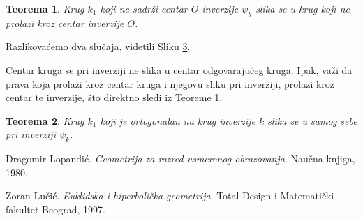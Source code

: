 \documentclass[a4paper,12pt]{article}
\newtheorem{teorema}{{Teorema}}[section]
\theoremstyle{definition}
\newcommand{\RomanNumeralCaps}[1]
    {\MakeUppercase{\romannumeral #1}}
\begin{document}
\begin{teorema}
\label{th:krugkrug}
Krug $k_1$ koji ne sadr\v{z}i centar $O$ inverzije $\psi_k$ slika se u krug koji ne prolazi kroz centar inverzije $O$.
\end{teorema}
Razlikova\'{c}emo dva slu\v{c}aja, videtili Sliku \ref{slk:2}.

\begin{figure}[h!]
	\begin{subfigure}{85mm}
		
		\label{slk:seku}
	\end{subfigure}
	\begin{subfigure}{85mm}
		
		\label{slk:ne_seku}
	\end{subfigure}
\caption{}
\label{sl:krugprava}
\label{slk:2}
\end{figure}

Centar kruga se pri inverziji ne slika u centar odgovaraju\'{c}eg kruga. Ipak, va\v{z}i da prava koja prolazi kroz centar kruga i njegovu sliku pri inverziji, prolazi kroz centar te inverzije, \v{s}to direktno sledi iz Teoreme \ref{th:krugkrug}.

\begin{teorema}
Krug $k_1$ koji je ortogonalan na krug inverzije $k$ slika se u samog sebe pri inverziji $\psi_k$.
\end{teorema}

\begin{figure}[h!]
   \begin{center}
       
   \end{center}
    \caption{}
    \label{slk:1}
\end{figure}

\newpage

\begin{thebibliography}{9}
Dragomir Lopandi\'{c}.
\textit{Geometrija za \RomanNumeralCaps{3} razred usmerenog obrazovanja}. 
Nau\v{c}na knjiga, 1980.

Zoran Lu\v{c}i\'{c}. 
\textit{Euklidska i hiperboli\v{c}ka geometrija}.
Total Design i Matemati\v{c}ki fakultet Beograd, 1997.

\end{thebibliography}
\end{document}
